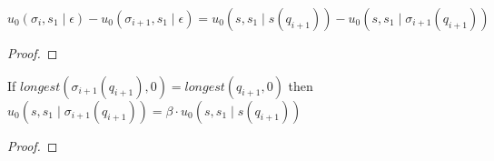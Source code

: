 \documentclass[11pt]{article}
\begin{document}
\begin{mylem}
\label{lemdif}
$u_0(\sigma_i,s_1 \mid \epsilon) - u_0(\sigma_{i+1},s_1 \mid \epsilon) = u_0(s,s_1 \mid s(q_{i+1})) - u_0(s,s_1 \mid \sigma_{i+1}(q_{i+1}))$
\end{mylem}
\begin{proof}
\iffalse
For any $i < N$ :

\begin{eqnarray*}
u_p(\bs \mid q) & = & \sum_{q' \in \bQ \,:\, q \subseteq q'} \beta^{|q'|-|q|} \cdot  r_p(q') \cdot \pr^{\bs}(q' \mid q)
\end{eqnarray*}

\begin{eqnarray*}
u_0(\sigma_{i+1},s_1 \mid \epsilon) & = & \sum_{q \in \bQ} \beta^{|q|} \cdot  r_0(q) \cdot \pr^{(\sigma_{i+1},s_1)}(q \mid \epsilon)\\
u_0(\sigma_{i+1},s_1 \mid \epsilon) & = & \sum_{q \in \bQ \,:\, |q| < |q_{i+1}| } \beta^{|q|} \cdot  r_0(q) \cdot \pr^{(\sigma_{i+1},s_1)}(q \mid \epsilon)\\
& & + \sum_{q \in \bQ \,:\, |q| \geq |q_{i+1}| } \beta^{|q|} \cdot  r_0(q) \cdot \pr^{(\sigma_{i+1},s_1)}(q \mid \epsilon)\\
u_0(\sigma_{i+1},s_1 \mid \epsilon) & = & \sum_{q \in \bQ \,:\, |q| < |q_{i+1}| } \beta^{|q|} \cdot  r_0(q) \cdot \pr^{(\sigma_{i+1},s_1)}(q \mid \epsilon)\\
& & + \sum_{q \in \bQ \,:\, |q| = |q_{i+1}| } u_0(\sigma_{i+1},s_1 \mid q) \cdot \pr^{(\sigma_{i+1},s_1)}(q \mid \epsilon)\\
\end{eqnarray*}

\begin{eqnarray*}
u_0(\sigma_{i+1},s_1 \mid \epsilon) & = & \sum_{q \in \bQ} \beta^{|q|} \cdot  r_0(q) \cdot \pr^{(\sigma_{i+1},s_1)}(q \mid \epsilon)\\
& = & \sum_{q \in \bQ \,:\, q_{i+1} \not \subseteq q} \beta^{|q|} \cdot  r_0(q) \cdot \pr^{(\sigma_{i},s_1)}(q \mid \epsilon) \\
&  & +  \sum_{q \in \bQ \,:\, q_{i+1} \subseteq q} \beta^{|q|} \cdot  r_0(q) \cdot \pr^{(\sigma_{i+1},s_1)}(q \mid \epsilon) \\
\end{eqnarray*}

\fi
\end{proof}

\begin{mylem}
\label{lembeta}
If $longest(\sigma_{i+1}(q_{i+1}),0) = longest(q_{i+1},0)$ then  $u_0(s,s_1 \mid \sigma_{i+1}(q_{i+1})) = \beta \cdot u_0(s,s_1 \mid s(q_{i+1}))$
\end{mylem}
\begin{proof}
\end{proof}
\end{document}
